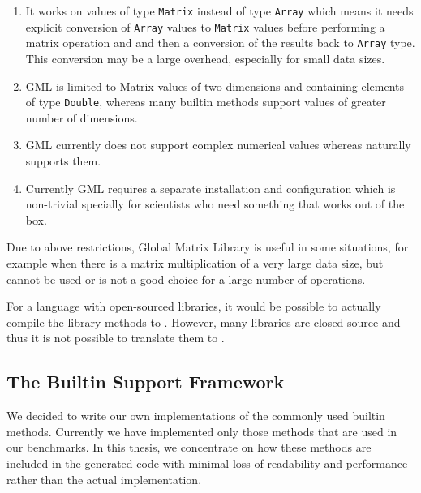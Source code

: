 \begin{enumerate}

\item It works on values of type \verb|Matrix| instead of \xten type
\verb|Array| which means it needs explicit conversion of \verb|Array|
values to \verb|Matrix| values before performing a matrix operation and
and then a conversion of the results back to \verb|Array| type. This
conversion may be  a large overhead, especially for small data sizes.

\item GML is limited to Matrix values of two dimensions and containing
elements of type \verb|Double|, whereas many \matlab builtin methods
support values of greater number of dimensions.

\item GML currently does not support complex numerical values whereas
\matlab naturally supports them.

\item Currently GML requires a separate installation and configuration which
is non-trivial specially for scientists who need something that works
out of the box.


\end{enumerate}

Due to above restrictions, \xten Global Matrix Library is useful in some
situations, for example when there is a matrix multiplication of a very
large data size, but cannot be used or is not a good choice for a large
number of operations.

For a language with open-sourced libraries, it would be possible to actually
compile the library methods to \xten.  However,  many \matlab libraries 
are closed source and thus it is not possible to translate them to \xten.

\subsection{ The \mixten Builtin Support Framework}

We decided to write our own \xten implementations of the commonly used
\matlab builtin methods. Currently we have implemented
only those methods that are used in our benchmarks. In this thesis, we
concentrate on how these methods are included in the generated \xten
code with minimal loss of readability and performance rather than the
actual implementation.

